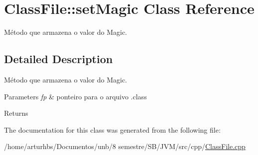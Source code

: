 \hypertarget{classClassFile_1_1setMagic}{}\section{Class\+File\+:\+:set\+Magic Class Reference}
\label{classClassFile_1_1setMagic}


Método que armazena o valor do Magic.  




\subsection{Detailed Description}
Método que armazena o valor do Magic. 


\begin{DoxyParams}{Parameters}
{\em fp} & ponteiro para o arquivo .class \\
\hline
\end{DoxyParams}
\begin{DoxyReturn}{Returns}

\end{DoxyReturn}


The documentation for this class was generated from the following file\+:\begin{DoxyCompactItemize}
\item 
/home/arturhbs/\+Documentos/unb/8 semestre/\+S\+B/\+J\+V\+M/src/cpp/\hyperlink{ClassFile_8cpp}{Class\+File.\+cpp}\end{DoxyCompactItemize}
